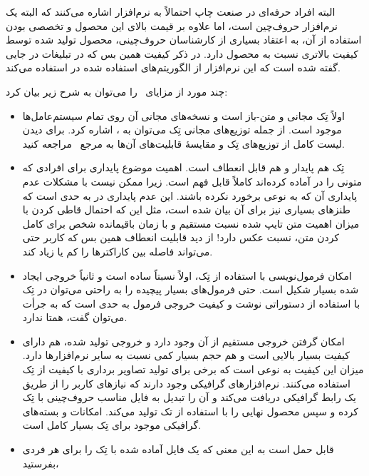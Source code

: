 البته افراد حرفه‌ای در صنعت چاپ احتمالاً به نرم‌افزار  اشاره می‌کنند
که البته یک نرم‌افزار حروف‌چین است، اما علاوه بر قیمت بالای این محصول و تخصصی
بودن استفاده از آن، به اعتقاد بسیاری از کارشناسان حروف‌چینی، محصول تولید شده
توسط \lr{\TeX}  کیفیت بالاتری نسبت به محصول  دارد. در ذکر کیفیت\lr{\TeX}  
همین بس که در تبلیغات    در جایی گفته شده است که این نرم‌افزار از الگوریتم‌های استفاده شده در \lr{\TeX}   استفاده می‌کند. 

چند مورد از مزایای \lr{\TeX} \ را می‌توان به شرح زیر بیان کرد:
\begin{itemize}
\item اولاً تِک مجانی و متن-باز است و نسخه‌های مجانی آن روی تمام سیستم‌عامل‌ها موجود است. از
جمله توزیع‌های مجانی تِک می‌توان به ،  اشاره کرد.
برای دیدن لیست کامل از توزیع‌های تِک  و مقایسۀ قابلیت‌های آن‌ها به مرجع~\cite{Latex} مراجعه کنید.
\item تِک هم پایدار و هم قابل انعطاف است. اهمیت موضوع پایداری برای افرادی که متونی
را در  آماده کرده‌اند کاملاً قابل فهم است. زیرا ممکن نیست با مشکلات عدم پایداری
آن که به نوعی برخورد نکرده باشند. این عدم پایداری در  به حدی است که
طنزهای بسیاری نیز برای آن بیان شده است، مثل این که احتمال قاطی کردن 
با میزان اهمیت متن تایپ شده نسبت مستقیم و با زمان باقیمانده شخص 
برای کامل کردن متن، نسبت عکس دارد! از دید قابلیت انعطاف همین بس که کاربر حتی
می‌تواند فاصله بین کاراکترها را کم یا زیاد کند. 
\item امکان فرمول‌نویسی با استفاده از تِک، اولاً نسبتاً ساده است و ثانیاً خروجی
ایجاد شده بسیار شکیل است. حتی فرمول‌های بسیار پیچیده را به راحتی می‌توان
در تِک با استفاده از دستوراتی نوشت و کیفیت خروجی فرمول به حدی است که به جرأت
می‌توان گفت، همتا ندارد.
\item امکان گرفتن خروجی  مستقیم از آن وجود دارد و خروجی 
تولید شده، هم دارای کیفیت بسیار بالایی است و هم حجم بسیار کمی نسبت به سایر نرم‌افزارها
دارد. میزان این کیفیت به نوعی است که برخی برای تولید تصاویر  برداری با کیفیت
از تِک استفاده می‌کنند. نرم‌افزارهای گرافیکی وجود دارند که نیازهای کاربر را از طریق یک رابط
گرافیکی دریافت می‌کند و آن را تبدیل به فایل مناسب حروف‌چینی با تِک کرده و سپس محصول نهایی
را با استفاده از تک تولید می‌کند. امکانات و بسته‌های گرافیکی موجود برای تِک بسیار کامل 
است. 
\item قابل حمل است به این معنی که یک فایل آماده شده با تِک را برای هر فردی بفرستید،

\end{itemize}

